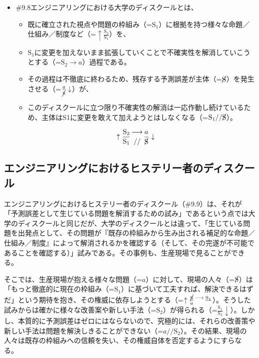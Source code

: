 \begin{note}{}
  \begin{itemize}
    \tightlist
    \item{\#9.8}エンジニアリングにおける大学のディスクールとは、
      \begin{itemize}
        \tightlist
        \item 既に確立された視点や問題の枠組み（=$\textrm{S}_1$）に根拠を持つ様々な命題／仕組み／制度など（=$\uparrow\frac{\textrm{S}_2}{\textrm{S}_1}$）を、
        \item $\textrm{S}_1$に変更を加えないまま拡張していくことで不確実性を解消していこうとする（=$\textrm{S}_2\rightarrow a$）過程である。
        \item その過程は不徹底に終わるため、残存する予測誤差が主体（=$\cancel{\textrm{S}}$）を発生させる（=$\frac{a}{\cancel{\textrm{S}}}\downarrow$）が、
        \item このディスクールに立つ限り不確実性の解消は一応作動し続けているため、主体はS1に変更を敢えて加えようとはしなくなる（=$\textrm{S}_1//\cancel{\textrm{S}}$）。
      \end{itemize}

$$
\uparrow\frac{\mathrm{S_2}}{\mathrm{S_1}}\genfrac{}{}{0pt}{}{\longrightarrow}{//}\frac{a}{\cancel{\textrm{S}}}\downarrow
$$
  \end{itemize}
\end{note}

\subsection{エンジニアリングにおけるヒステリー者のディスクール}\label{ux30a8ux30f3ux30b8ux30cbux30a2ux30eaux30f3ux30b0ux306bux304aux3051ux308bux30d2ux30b9ux30c6ux30eaux30fcux8005ux306eux30c7ux30a3ux30b9ux30afux30fcux30eb}

エンジニアリングにおけるヒステリー者のディスクール（\#9.9）は、それが「予測誤差として生じている問題を解消するための試み」であるという点では大学のディスクールと同じだが、大学のディスクールとは違って、「生じている問題を出発点として、その問題が『既存の枠組みから生み出される補足的な命題／仕組み／制度』によって解消されるかを確認する（そして、その完遂が不可能であることを確認する）」試みである。その事例も、生産現場で見ることができる。

そこでは、生産現場が抱える様々な問題（=\(a\)）に対して、現場の人々（=\(\cancel{\textrm{S}}\)）は「もっと徹底的に現在の枠組み（=\(\textrm{S}_1\)）に基づいて工夫すれば、解決できるはずだ」という期待を抱き、その権威に依存しようとする（=\(\uparrow\frac{\cancel{\textrm{S}}}{a}\genfrac{}{}{0pt}{}{\longrightarrow}{}\frac{\textrm{S}_1}{}\)）。そうした試みからは確かに様々な改善案や新しい手法（=\(\textrm{S}_2\)）が得られる（=\(\frac{\textrm{S}_1}{\textrm{S}_2}\downarrow\)）。しかし、本質的に予測誤差はゼロにはならないので、究極的には、それらの改善策や新しい手法は問題を解決しきることができない（=\(a//\textrm{S}_2\)）。その結果、現場の人々は既存の枠組みへの信頼を失い、その権威自体を否定するようにすらなる。

